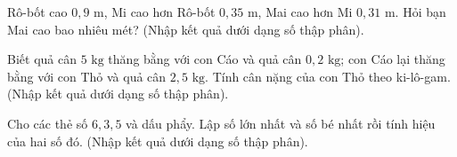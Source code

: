 \begin{ex} %
Rô-bốt cao $0{,}9\text{ m}$, Mi cao hơn Rô-bốt $0{,}35\text{ m}$, Mai cao hơn Mi $0{,}31\text{ m}$. Hỏi bạn Mai cao bao nhiêu mét? (Nhập kết quả dưới dạng số thập phân).
\end{ex}

\begin{ex} %
Biết quả cân $5\text{ kg}$ thăng bằng với con Cáo và quả cân $0{,}2\text{ kg}$; con Cáo lại thăng bằng với con Thỏ và quả cân $2{,}5\text{ kg}$. Tính cân nặng của con Thỏ theo ki-lô-gam. (Nhập kết quả dưới dạng số thập phân).
\end{ex}

\begin{ex} %
Cho các thẻ số $6, 3, 5$ và dấu phẩy. Lập số lớn nhất và số bé nhất rồi tính hiệu của hai số đó. (Nhập kết quả dưới dạng số thập phân).
\end{ex}
